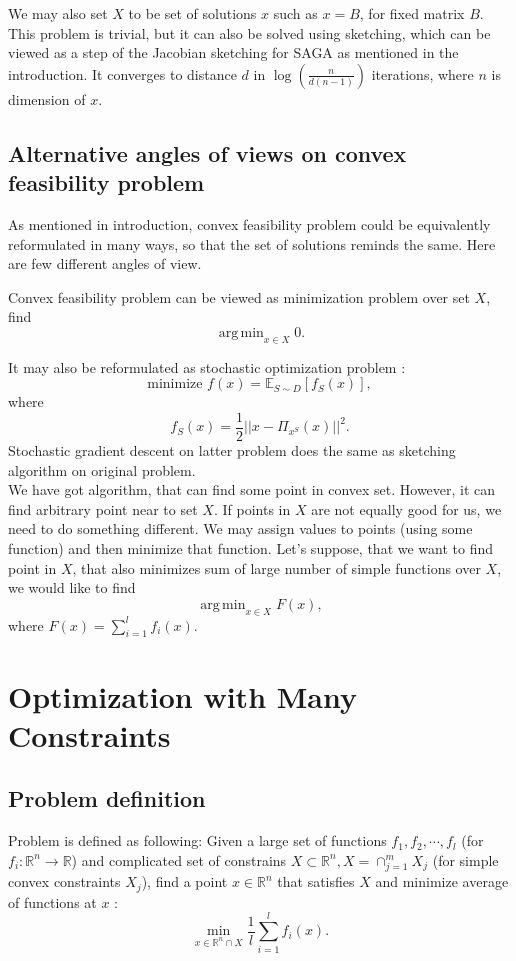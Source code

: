 \documentclass[11pt]{book}
\newcommand{\R}{\mathbb{R}}
\newcommand{\E}{\mathbb{E}}
\DeclareMathOperator*{\argmin}{arg\,min}
\theoremstyle{definition}
\begin{document}
	We may also set $X$ to be set of solutions $x$ such as $x=B$, for fixed matrix $B$. This problem is trivial, but it can also be solved using sketching, which can be viewed as a step of the Jacobian sketching for SAGA as mentioned in the introduction. It converges to distance $d$ in $\log(\frac{n}{d(n-1)})$\label{xIsB} iterations, where $n$ is dimension of $x$.\\
	
	\section{Alternative angles of views on convex feasibility problem}
	As mentioned in introduction, convex feasibility problem could be equivalently reformulated in many ways, so that the set of solutions reminds the same. Here are few different angles of view.
	
	Convex feasibility problem can be viewed as minimization problem over set $X$, find $$\argmin_{x \in X} 0.$$
	
	It may also be reformulated as stochastic optimization problem \cite{sketchAndProject}: $$\text{minimize } f(x)=\E_{S \sim D}[f_S(x)],$$ where $$f_S(x) = \frac{1}{2}||x-\Pi_{x^S}(x)||^2.$$
	Stochastic gradient descent on latter problem does the same as sketching algorithm on original problem.\\
	
	We have got algorithm, that can find some point in convex set. However, it can find arbitrary point near to set $X$. If points in $X$ are not equally good for us, we need to do something different. We may assign values to points (using some function) and then minimize that function. Let's suppose, that we want to find point in $X$, that also minimizes sum of large number of simple functions over $X$, we would like to find $$\argmin_{x \in X} F(x),$$ where $F(x)=\sum_{i=1}^{l}f_i(x).$
	
	
	
	\chapter{Optimization with Many Constraints}
	
	\section{Problem definition}
	Problem is defined as following: Given a large set of functions $f_1,f_2,\cdots,f_l$ (for $f_i: \R^n \rightarrow \R$) and complicated set of constrains $X \subset \R^n, X = \cap_{j=1}^m X_j$ (for simple convex constraints $X_j$), find a point $x \in \R^n$ that satisfies $X$ and minimize average of functions at $x$ \cite{kosto}: $$ \min_{x \in \R^n \cap X} \frac{1}{l}\sum_{i=1}^l f_i(x).$$
	
\end{document}
